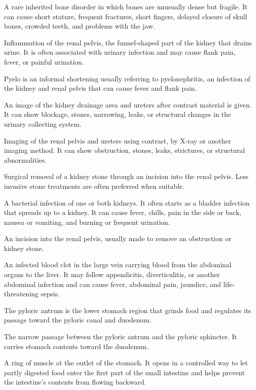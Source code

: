  A rare inherited bone disorder in which bones are unusually dense but fragile. It can cause short stature, frequent fractures, short fingers, delayed closure of skull bones, crowded teeth, and problems with the jaw.

 Inflammation of the renal pelvis, the funnel-shaped part of the kidney that drains urine. It is often associated with urinary infection and may cause flank pain, fever, or painful urination.

 Pyelo is an informal shortening usually referring to pyelonephritis, an infection of the kidney and renal pelvis that can cause fever and flank pain.

 An image of the kidney drainage area and ureters after contrast material is given. It can show blockage, stones, narrowing, leaks, or structural changes in the urinary collecting system.

 Imaging of the renal pelvis and ureters using contrast, by X-ray or another imaging method. It can show obstruction, stones, leaks, strictures, or structural abnormalities.

 Surgical removal of a kidney stone through an incision into the renal pelvis. Less invasive stone treatments are often preferred when suitable.

 A bacterial infection of one or both kidneys. It often starts as a bladder infection that spreads up to a kidney. It can cause fever, chills, pain in the side or back, nausea or vomiting, and burning or frequent urination.

 An incision into the renal pelvis, usually made to remove an obstruction or kidney stone.

 An infected blood clot in the large vein carrying blood from the abdominal organs to the liver. It may follow appendicitis, diverticulitis, or another abdominal infection and can cause fever, abdominal pain, jaundice, and life-threatening sepsis.

 The pyloric antrum is the lower stomach region that grinds food and regulates its passage toward the pyloric canal and duodenum.

 The narrow passage between the pyloric antrum and the pyloric sphincter. It carries stomach contents toward the duodenum.

 A ring of muscle at the outlet of the stomach. It opens in a controlled way to let partly digested food enter the first part of the small intestine and helps prevent the intestine's contents from flowing backward.

